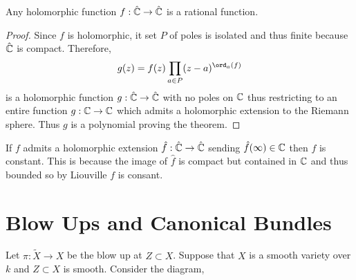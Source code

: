 \documentclass[12pt]{article}
\begin{document}
\begin{prop}
Any holomorphic function $f : \hat{\mathbb{C}} \to \hat{\mathbb{C}}$ is a rational function.
\end{prop}


\begin{proof}
Since $f$ is holomorphic, it set $P$ of poles is isolated and thus finite because $\hat{\mathbb{C}}$ is compact. Therefore,
\[ g(z) = f(z) \prod_{a \in P} (z - a)^{\ord_a(f)} \]
is a holomorphic function $g : \hat{\mathbb{C}} \to \hat{\mathbb{C}}$ with no poles on $\mathbb{C}$ thus restricting to an entire function $g : \mathbb{C} \to \mathbb{C}$ which admits a holomorphic extension to the Riemann sphere. Thus $g$ is a polynomial proving the theorem. 
\end{proof}

\begin{rmk}
If $f$ admits a holomorphic extension $\hat{f} : \hat{\mathbb{C}} \to \hat{\mathbb{C}}$ sending $\hat{f}(\infty) \in \mathbb{C}$ then $f$ is constant. This is because the image of $\hat{f}$ is compact but contained in $\mathbb{C}$ and thus bounded so by Liouville $f$ is consant.
\end{rmk}



\section{Blow Ups and Canonical Bundles}

Let $\pi : \tilde{X} \to X$ be the blow up at $Z \subset X$. Suppose that $X$ is a smooth variety over $k$ and $Z \subset X$ is smooth. Consider the diagram,
\end{document}
